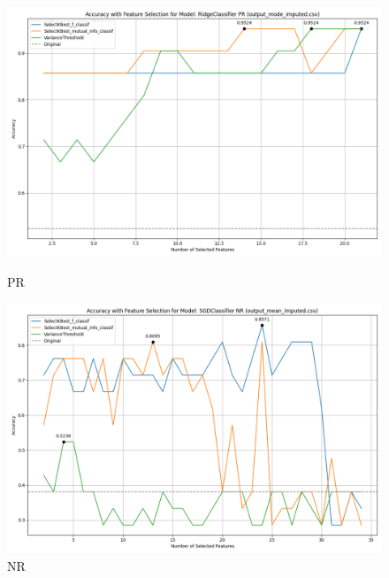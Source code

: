 \begin{figure}[H]
    \centering
    \begin{minipage}[b]{0.45\textwidth}
            \includegraphics[width=\textwidth]{class_specific_section/images_class_ensemble_reduction/feature_selection_accuracy_plot_output_mode_imputedcsv_RidgeClassifier_PR.png}
        \caption{PR}
        \label{fig_class_spec:pr_featred_graph}
    \end{minipage}
    \hfill
    \begin{minipage}[b]{0.45\textwidth}
        \includegraphics[width=\textwidth]{class_specific_section/images_class_ensemble_reduction/feature_selection_accuracy_plot_output_mean_imputedcsv_SGDClassifier_NR.png}
        \caption{NR}
        \label{fig_class_spec:nr_featred_graph}
    \end{minipage}
\end{figure}


